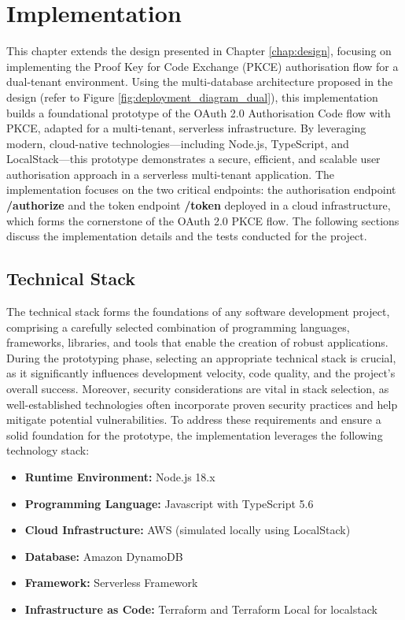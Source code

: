 \chapter{Implementation}

This chapter extends the design presented in Chapter \ref{chap:design}, focusing on implementing the Proof Key for Code Exchange (PKCE) authorisation flow for a dual-tenant environment. Using the multi-database architecture proposed in the design (refer to Figure \ref{fig:deployment_diagram_dual}), this implementation builds a foundational prototype of the OAuth 2.0 Authorisation Code flow with PKCE, adapted for a multi-tenant, serverless infrastructure. By leveraging modern, cloud-native technologies—including Node.js, TypeScript, and LocalStack—this prototype demonstrates a secure, efficient, and scalable user authorisation approach in a serverless multi-tenant application. The implementation focuses on the two critical endpoints: the authorisation endpoint \textbf{/authorize} and the token endpoint \textbf{/token} deployed in a cloud infrastructure, which forms the cornerstone of the OAuth 2.0 PKCE flow. The following sections discuss the implementation details and the tests conducted for the project.


\section{Technical Stack}
The technical stack forms the foundations of any software development project, comprising a carefully selected combination of programming languages, frameworks, libraries, and tools that enable the creation of robust applications. During the prototyping phase, selecting an appropriate technical stack is crucial, as it significantly influences development velocity, code quality, and the project's overall success. Moreover, security considerations are vital in stack selection, as well-established technologies often incorporate proven security practices and help mitigate potential vulnerabilities. To address these requirements and ensure a solid foundation for the prototype, the implementation leverages the following technology stack:

\begin{itemize}
    \item \textbf{Runtime Environment:} Node.js 18.x
    \item \textbf{Programming Language:} Javascript with TypeScript 5.6
    \item \textbf{Cloud Infrastructure:} AWS (simulated locally using LocalStack)
    \item \textbf{Database:} Amazon DynamoDB
    \item \textbf{Framework:} Serverless Framework
    \item \textbf{Infrastructure as Code:} Terraform and Terraform Local for localstack

\end{itemize}

